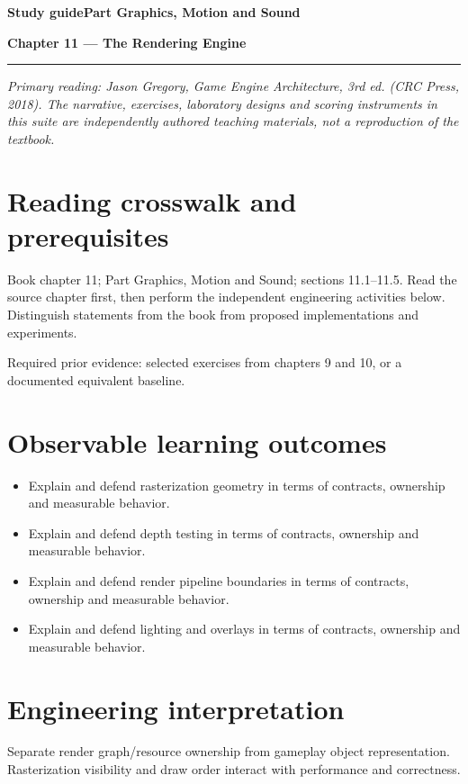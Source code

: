 \documentclass[11pt,letterpaper]{article}
\newcommand{\DocType}{Reference}
\newcommand{\SuiteHeading}[3]{%
\renewcommand{\DocType}{#2}%
{\small\bfseries\sffamily\color{EngineTeal}#2\hfill #3}\par\vspace{6pt}
{\LARGE\bfseries\color{EngineBlue}#1}\par\vspace{4pt}
{\color{EngineTeal}\rule{\linewidth}{1pt}}\par\vspace{7pt}}
\newcommand{\SourceNote}{\footnotesize\textit{Primary reading: Jason Gregory, \emph{Game Engine Architecture}, 3rd ed. (CRC Press, 2018). The narrative, exercises, laboratory designs and scoring instruments in this suite are independently authored teaching materials, not a reproduction of the textbook.}\normalsize\par}
\begin{document}
\SuiteHeading{Chapter 11 — The Rendering Engine}{Study guide}{Part Graphics, Motion and Sound}
\SourceNote
\section{Reading crosswalk and prerequisites}
Book chapter 11; Part Graphics, Motion and Sound; sections 11.1--11.5. Read the source chapter first, then perform the independent engineering activities below. Distinguish statements from the book from proposed implementations and experiments.

Required prior evidence: selected exercises from chapters 9 and 10, or a documented equivalent baseline.

\section{Observable learning outcomes}
\begin{itemize}
\item Explain and defend rasterization geometry in terms of contracts, ownership and measurable behavior.
\item Explain and defend depth testing in terms of contracts, ownership and measurable behavior.
\item Explain and defend render pipeline boundaries in terms of contracts, ownership and measurable behavior.
\item Explain and defend lighting and overlays in terms of contracts, ownership and measurable behavior.
\end{itemize}
\section{Engineering interpretation}
Separate render graph/resource ownership from gameplay object representation. Rasterization visibility and draw order interact with performance and correctness.
\end{document}
